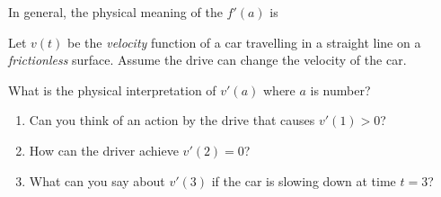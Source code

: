 \documentclass[../main.tex]{subfiles}
\begin{document}
In general, the physical meaning of the \(f'(a)\) is 
\vspace{2in}
\clearpage

\begin{example}
  Let \(v(t)\) be the \emph{velocity} function of a car travelling in a straight line on a \emph{frictionless} surface. 
  Assume the drive can change the velocity of the car.
  \vspace{1in}

  What is the physical interpretation of \(v'(a)\) where \(a\) is number?
  \vspace{1in}

  \begin{enumerate}
  \item Can you think of an action by the drive that causes \(v'(1) > 0\)?
    \vfill

  \item How can the driver achieve \(v'(2) = 0\)?
    \vfill

  \item What can you say about \(v'(3)\) if the car is slowing down at time \(t = 3\)?
    \vfill
  \end{enumerate}
\end{example}

\clearpage
\end{document}
